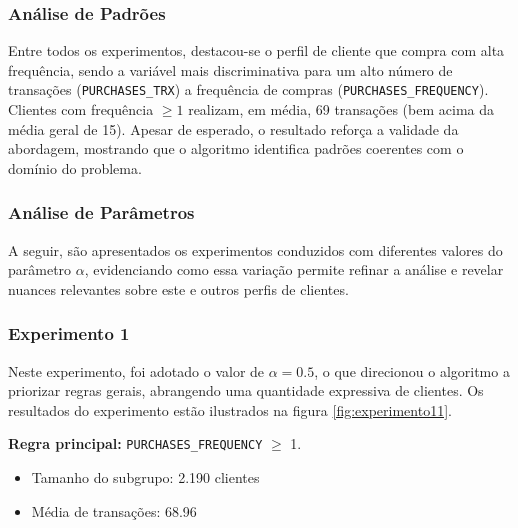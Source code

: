 \documentclass[12pt]{article}
\begin{document}
\subsubsection{Análise de Padrões}

\hspace{1.2cm}Entre todos os experimentos, destacou-se o perfil de cliente que compra com alta frequência, sendo a variável mais discriminativa para um alto número de transações (\texttt{PURCHASES\_TRX}) a frequência de compras (\texttt{PURCHASES\_FREQUENCY}). Clientes com frequência $\geq 1$ realizam, em média, 69 transações (bem acima da média geral de 15). Apesar de esperado, o resultado reforça a validade da abordagem, mostrando que o algoritmo identifica padrões coerentes com o domínio do problema.

\subsubsection{Análise de Parâmetros}

\hspace{1.2cm}A seguir, são apresentados os experimentos conduzidos com diferentes valores do parâmetro $\alpha$, evidenciando como essa variação permite refinar a análise e revelar nuances relevantes sobre este e outros perfis de clientes.

\subsubsection*{Experimento 1} \label{sec:exp1}

\hspace{1.2cm}Neste experimento, foi adotado o valor de $\alpha = 0.5$, o que direcionou o algoritmo a priorizar regras gerais, abrangendo uma quantidade expressiva de clientes. Os resultados do experimento estão ilustrados na figura \ref{fig:experimento11}.

\textbf{Regra principal:} \texttt{PURCHASES\_FREQUENCY} $\geq$ 1.

    \begin{itemize}
        \item Tamanho do subgrupo: 2.190 clientes
        \item Média de transações: 68.96
    \end{itemize}
\end{document}
